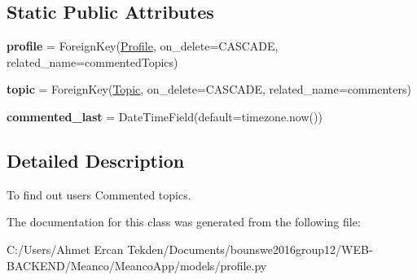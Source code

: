 \subsection*{Static Public Attributes}
\begin{DoxyCompactItemize}
\item 
\hypertarget{class_meanco_app_1_1models_1_1profile_1_1_commented_topic_a89e87e167714535002b306ac1af27563}{}\label{class_meanco_app_1_1models_1_1profile_1_1_commented_topic_a89e87e167714535002b306ac1af27563} 
{\bfseries profile} = Foreign\+Key(\hyperlink{class_meanco_app_1_1models_1_1profile_1_1_profile}{Profile}, on\+\_\+delete=C\+A\+S\+C\+A\+DE, related\+\_\+name=\textquotesingle{}commented\+Topics\textquotesingle{})
\item 
\hypertarget{class_meanco_app_1_1models_1_1profile_1_1_commented_topic_a4dd43e79d80d48b08d6dad19a7835340}{}\label{class_meanco_app_1_1models_1_1profile_1_1_commented_topic_a4dd43e79d80d48b08d6dad19a7835340} 
{\bfseries topic} = Foreign\+Key(\hyperlink{class_meanco_app_1_1models_1_1topic_1_1_topic}{Topic}, on\+\_\+delete=C\+A\+S\+C\+A\+DE, related\+\_\+name=\textquotesingle{}commenters\textquotesingle{})
\item 
\hypertarget{class_meanco_app_1_1models_1_1profile_1_1_commented_topic_a8e04e242811aa80b61d32c86db50c8a7}{}\label{class_meanco_app_1_1models_1_1profile_1_1_commented_topic_a8e04e242811aa80b61d32c86db50c8a7} 
{\bfseries commented\+\_\+last} = Date\+Time\+Field(default=timezone.\+now())
\end{DoxyCompactItemize}


\subsection{Detailed Description}
To find out users Commented topics. 



The documentation for this class was generated from the following file\+:\begin{DoxyCompactItemize}
\item 
C\+:/\+Users/\+Ahmet Ercan Tekden/\+Documents/bounswe2016group12/\+W\+E\+B-\/\+B\+A\+C\+K\+E\+N\+D/\+Meanco/\+Meanco\+App/models/profile.\+py\end{DoxyCompactItemize}
